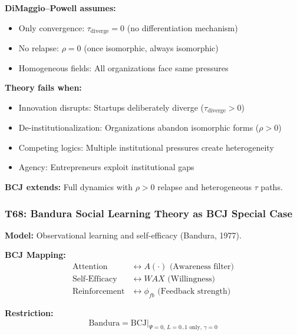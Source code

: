 \begin{tcolorbox}[colback=red!5!white, colframe=red!75!black,
    title=Boundary Condition: Where DiMaggio--Powell Fails]
\textbf{DiMaggio--Powell assumes:}
\begin{itemize}[nosep]
\item Only convergence: $\tau_{\text{diverge}} = 0$ (no differentiation mechanism)
\item No relapse: $\rho = 0$ (once isomorphic, always isomorphic)
\item Homogeneous fields: All organizations face same pressures
\end{itemize}

\textbf{Theory fails when:}
\begin{itemize}[nosep]
\item Innovation disrupts: Startups deliberately diverge ($\tau_{\text{diverge}} > 0$)
\item De-institutionalization: Organizations abandon isomorphic forms ($\rho > 0$)
\item Competing logics: Multiple institutional pressures create heterogeneity
\item Agency: Entrepreneurs exploit institutional gaps
\end{itemize}

\textbf{BCJ extends:} Full dynamics with $\rho > 0$ relapse and heterogeneous $\tau$ paths.
\end{tcolorbox}

\subsubsection*{T68: Bandura Social Learning Theory as BCJ Special Case}

\textbf{Model:} Observational learning and self-efficacy (Bandura, 1977).

\textbf{BCJ Mapping:}
\begin{align}
\text{Attention} &\leftrightarrow A(\cdot) \text{ (Awareness filter)} \\
\text{Self-Efficacy} &\leftrightarrow WAX \text{ (Willingness)} \\
\text{Reinforcement} &\leftrightarrow \phi_{fb} \text{ (Feedback strength)}
\end{align}

\textbf{Restriction:}
\begin{equation}
\text{Bandura} = \text{BCJ} \big|_{\Psi = 0, \, L = 0..1 \text{ only}, \, \gamma = 0}
\end{equation}

